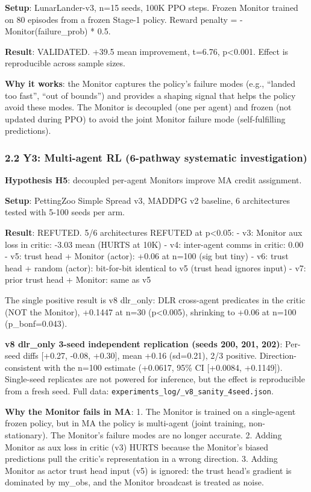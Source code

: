 \documentclass[
]{article}
\begin{document}
\textbf{Setup}: LunarLander-v3, n=15 seeds, 100K PPO steps. Frozen
Monitor trained on 80 episodes from a frozen Stage-1 policy. Reward
penalty = -Monitor(failure\_prob) * 0.5.

\textbf{Result}: VALIDATED. +39.5 mean improvement, t=6.76,
p\textless0.001. Effect is reproducible across sample sizes.

\textbf{Why it works}: the Monitor captures the policy's failure modes
(e.g., ``landed too fast'', ``out of bounds'') and provides a shaping
signal that helps the policy avoid these modes. The Monitor is decoupled
(one per agent) and frozen (not updated during PPO) to avoid the joint
Monitor failure mode (self-fulfilling predictions).

\subsubsection{2.2 Y3: Multi-agent RL (6-pathway systematic
investigation)}\label{y3-multi-agent-rl-6-pathway-systematic-investigation}

\textbf{Hypothesis H5}: decoupled per-agent Monitors improve MA credit
assignment.

\textbf{Setup}: PettingZoo Simple Spread v3, MADDPG v2 baseline, 6
architectures tested with 5-100 seeds per arm.

\textbf{Result}: REFUTED. 5/6 architectures REFUTED at p\textless0.05: -
v3: Monitor aux loss in critic: -3.03 mean (HURTS at 10K) - v4:
inter-agent comms in critic: 0.00 - v5: trust head + Monitor (actor):
+0.06 at n=100 (sig but tiny) - v6: trust head + random (actor):
bit-for-bit identical to v5 (trust head ignores input) - v7: prior trust
head + Monitor: same as v5

The single positive result is v8 dlr\_only: DLR cross-agent predicates
in the critic (NOT the Monitor), +0.1447 at n=30 (p\textless0.005),
shrinking to +0.06 at n=100 (p\_bonf=0.043).

\textbf{v8 dlr\_only 3-seed independent replication (seeds 200, 201,
202)}: Per-seed diffs {[}+0.27, -0.08, +0.30{]}, mean +0.16 (sd=0.21),
2/3 positive. Direction-consistent with the n=100 estimate (+0.0617,
95\% CI {[}+0.0084, +0.1149{]}). Single-seed replicates are not powered
for inference, but the effect is reproducible from a fresh seed. Full
data: \texttt{experiments\_log/\_v8\_sanity\_4seed.json}.

\textbf{Why the Monitor fails in MA}: 1. The Monitor is trained on a
single-agent frozen policy, but in MA the policy is multi-agent (joint
training, non- stationary). The Monitor's failure modes are no longer
accurate. 2. Adding Monitor as aux loss in critic (v3) HURTS because the
Monitor's biased predictions pull the critic's representation in a wrong
direction. 3. Adding Monitor as actor trust head input (v5) is ignored:
the trust head's gradient is dominated by my\_obs, and the Monitor
broadcast is treated as noise.
\end{document}

